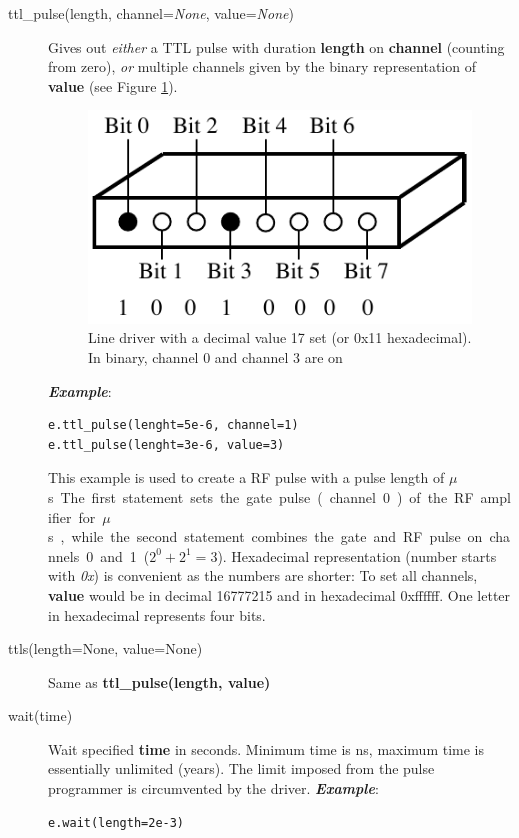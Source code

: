 \documentclass[12pt, a4paper, BCOR10mm, twoside, titlepage, headinclude]{scrbook}
\begin{document}
\begin{description}

\item[ttl\_pulse(length, channel=\textit{None}, value=\textit{None})]
Gives out \emph{either} a \textsf{TTL} pulse with duration \textbf{length} on \textbf{channel} (counting from zero), \emph{or} multiple channels given by the binary representation of \textbf{value} (see Figure \ref{binary}).
\begin{figure}
\centering
\includegraphics[]{pins_ttl_bit}
\caption{Line driver with a decimal value 17 set (or 0x11 hexadecimal). In binary, channel 0 and channel 3 are on}
\label{binary}
\end{figure}
\newline
\emph{\textbf{Example}}:
\begin{lstlisting}
e.ttl_pulse(lenght=5e-6, channel=1)
e.ttl_pulse(lenght=3e-6, value=3)
\end{lstlisting}
This example is used to create a RF pulse with a pulse length of \unit[3]{$\mu$s}. The first statement sets the gate pulse (channel 0) of the RF amplifier for \unit[5]{$\mu$s}, while the second  statement combines the gate and RF pulse on channels 0 and 1 ($2^0 + 2^1 = 3$). Hexadecimal representation (number starts with \emph{0x}) is convenient as the numbers are shorter: To set all channels, \textbf{value} would be in decimal 16777215 and in hexadecimal 0xffffff. One letter in hexadecimal represents four bits.

\item[ttls(length=None, value=None)]
Same as \textbf{ttl\_pulse(length, value)}

\item[wait(time)]
Wait specified \textbf{time} in seconds. Minimum time is \unit[90]{ns}, maximum time is essentially  unlimited (years). The limit imposed from the pulse programmer is circumvented by the driver.
\newline
\emph{\textbf{Example}}:
\begin{lstlisting}
e.wait(length=2e-3)
\end{lstlisting}


\end{description}
\end{document}
